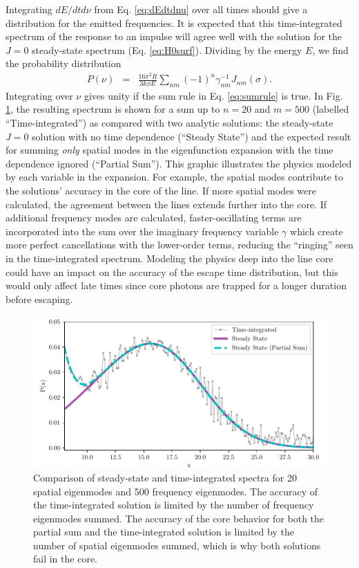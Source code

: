 \documentclass{aastex63}
\newcommand{\be}{\begin{eqnarray}}
\newcommand{\ee}{\end{eqnarray}}
\begin{document}
Integrating $dE/dt d\nu$ from Eq. \ref{eq:dEdtdnu} over all times should give a distribution for the emitted frequencies. It is expected that this time-integrated spectrum of the response to an impulse will agree well with the solution for the $J=0$ steady-state spectrum (Eq. \ref{eq:H0surf}). Dividing by the energy $E$, we find the probability distribution
\be \label{eq:spectrum}
P(\nu) & = &  \frac{16\pi^2 R}{3k\phi E}  \sum_{nm} (-1)^n \gamma_{nm}^{-1} J_{nm}(\sigma).
\ee
Integrating over $\nu$ gives unity if the sum rule in Eq. \ref{eq:sumrule} is true. In Fig. \ref{fig:steadystate}, the resulting spectrum is shown for a sum up to $n=20$ and $m=500$ (labelled ``Time-integrated'') as compared with two analytic solutions: the steady-state $J=0$ solution with no time dependence (``Steady State'') and the expected result for summing \textit{only} spatial modes in the eigenfunction expansion with the time dependence ignored (``Partial Sum''). This graphic illustrates the physics modeled by each variable in the expansion. For example, the spatial modes contribute to the solutions' accuracy in the core of the line. If more spatial modes were calculated, the agreement between the lines extends further into the core. If additional frequency modes are calculated, faster-oscillating terms are incorporated into the sum over the imaginary frequency variable $\gamma$ which create more perfect cancellations with the lower-order terms, reducing the ``ringing'' seen in the time-integrated spectrum. Modeling the physics deep into the line core could have an impact on the accuracy of the escape time distribution, but this would only affect late times since core photons are trapped for a longer duration before escaping.

\begin{figure}
    \centering
    \includegraphics{steadystate.pdf}
    \caption{Comparison of steady-state and time-integrated spectra for 20 spatial eigenmodes and 500 frequency eigenmodes. The accuracy of the time-integrated solution is limited by the number of frequency eigenmodes summed. The accuracy of the core behavior for both the partial sum and the time-integrated solution is limited by the number of spatial eigenmodes summed, which is why both solutions fail in the core.}
    \label{fig:steadystate}
\end{figure}
\end{document}
